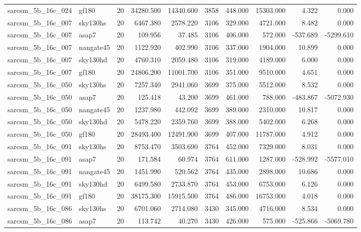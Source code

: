\documentclass{article}
\begin{document}
\begin{longtable}{llrrrrrrrr}
sarcsm\_5b\_16c\_024 & gf180 & 20 & 34280.500 & 14340.600 & 3858 & 448.000 & 15303.000 & 4.322 & 0.000 \\
sarcsm\_5b\_16c\_007 & sky130hs & 20 & 6467.380 & 2578.220 & 3106 & 329.000 & 4721.000 & 8.482 & 0.000 \\
sarcsm\_5b\_16c\_007 & asap7 & 20 & 109.956 & 37.485 & 3106 & 406.000 & 572.000 & -537.689 & -5299.610 \\
sarcsm\_5b\_16c\_007 & nangate45 & 20 & 1122.920 & 402.990 & 3106 & 337.000 & 1904.000 & 10.899 & 0.000 \\
sarcsm\_5b\_16c\_007 & sky130hd & 20 & 4760.310 & 2059.480 & 3106 & 319.000 & 4189.000 & 6.000 & 0.000 \\
sarcsm\_5b\_16c\_007 & gf180 & 20 & 24806.200 & 11001.700 & 3106 & 351.000 & 9510.000 & 4.651 & 0.000 \\
sarcsm\_5b\_16c\_050 & sky130hs & 20 & 7257.340 & 2941.060 & 3699 & 375.000 & 5512.000 & 8.532 & 0.000 \\
sarcsm\_5b\_16c\_050 & asap7 & 20 & 125.418 & 43.200 & 3699 & 461.000 & 788.000 & -483.867 & -5072.930 \\
sarcsm\_5b\_16c\_050 & nangate45 & 20 & 1237.980 & 442.092 & 3699 & 389.000 & 2310.000 & 10.817 & 0.000 \\
sarcsm\_5b\_16c\_050 & sky130hd & 20 & 5478.220 & 2359.760 & 3699 & 388.000 & 5402.000 & 6.268 & 0.000 \\
sarcsm\_5b\_16c\_050 & gf180 & 20 & 28493.400 & 12491.900 & 3699 & 407.000 & 11787.000 & 4.912 & 0.000 \\
sarcsm\_5b\_16c\_091 & sky130hs & 20 & 8753.470 & 3503.690 & 3764 & 452.000 & 7329.000 & 8.031 & 0.000 \\
sarcsm\_5b\_16c\_091 & asap7 & 20 & 171.584 & 60.974 & 3764 & 611.000 & 1287.000 & -528.992 & -5577.010 \\
sarcsm\_5b\_16c\_091 & nangate45 & 20 & 1451.990 & 520.562 & 3764 & 435.000 & 2898.000 & 10.686 & 0.000 \\
sarcsm\_5b\_16c\_091 & sky130hd & 20 & 6499.580 & 2733.870 & 3764 & 453.000 & 6753.000 & 6.126 & 0.000 \\
sarcsm\_5b\_16c\_091 & gf180 & 20 & 38175.300 & 15915.500 & 3764 & 486.000 & 16753.000 & 4.018 & 0.000 \\
sarcsm\_5b\_16c\_086 & sky130hs & 20 & 6701.060 & 2714.080 & 3430 & 345.000 & 4716.000 & 8.534 & 0.000 \\
sarcsm\_5b\_16c\_086 & asap7 & 20 & 113.742 & 40.270 & 3430 & 426.000 & 575.000 & -525.866 & -5069.780 \\

\end{longtable}
\end{document}
